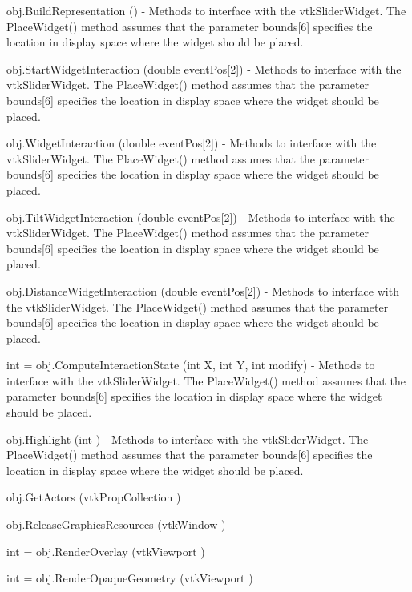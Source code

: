 \begin{DoxyItemize}
\item {\ttfamily obj.\-Build\-Representation ()} -\/ Methods to interface with the vtk\-Slider\-Widget. The Place\-Widget() method assumes that the parameter bounds\mbox{[}6\mbox{]} specifies the location in display space where the widget should be placed.  
\item {\ttfamily obj.\-Start\-Widget\-Interaction (double event\-Pos\mbox{[}2\mbox{]})} -\/ Methods to interface with the vtk\-Slider\-Widget. The Place\-Widget() method assumes that the parameter bounds\mbox{[}6\mbox{]} specifies the location in display space where the widget should be placed.  
\item {\ttfamily obj.\-Widget\-Interaction (double event\-Pos\mbox{[}2\mbox{]})} -\/ Methods to interface with the vtk\-Slider\-Widget. The Place\-Widget() method assumes that the parameter bounds\mbox{[}6\mbox{]} specifies the location in display space where the widget should be placed.  
\item {\ttfamily obj.\-Tilt\-Widget\-Interaction (double event\-Pos\mbox{[}2\mbox{]})} -\/ Methods to interface with the vtk\-Slider\-Widget. The Place\-Widget() method assumes that the parameter bounds\mbox{[}6\mbox{]} specifies the location in display space where the widget should be placed.  
\item {\ttfamily obj.\-Distance\-Widget\-Interaction (double event\-Pos\mbox{[}2\mbox{]})} -\/ Methods to interface with the vtk\-Slider\-Widget. The Place\-Widget() method assumes that the parameter bounds\mbox{[}6\mbox{]} specifies the location in display space where the widget should be placed.  
\item {\ttfamily int = obj.\-Compute\-Interaction\-State (int X, int Y, int modify)} -\/ Methods to interface with the vtk\-Slider\-Widget. The Place\-Widget() method assumes that the parameter bounds\mbox{[}6\mbox{]} specifies the location in display space where the widget should be placed.  
\item {\ttfamily obj.\-Highlight (int )} -\/ Methods to interface with the vtk\-Slider\-Widget. The Place\-Widget() method assumes that the parameter bounds\mbox{[}6\mbox{]} specifies the location in display space where the widget should be placed.  
\item {\ttfamily obj.\-Get\-Actors (vtk\-Prop\-Collection )}  
\item {\ttfamily obj.\-Release\-Graphics\-Resources (vtk\-Window )}  
\item {\ttfamily int = obj.\-Render\-Overlay (vtk\-Viewport )}  
\item {\ttfamily int = obj.\-Render\-Opaque\-Geometry (vtk\-Viewport )}  

\end{DoxyItemize}
